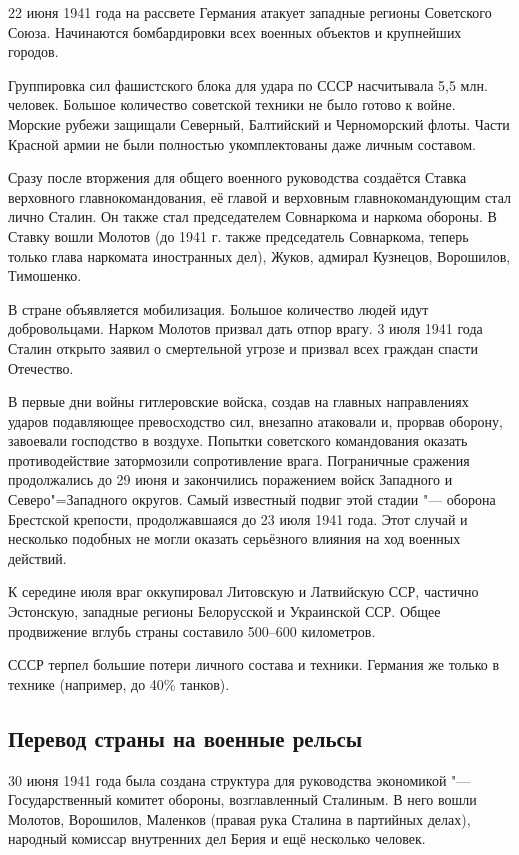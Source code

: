 22 июня 1941 года на рассвете Германия атакует западные регионы Советского Союза. Начинаются бомбардировки всех военных объектов и крупнейших городов.

Группировка сил фашистского блока для удара по СССР насчитывала 5,5 млн. человек. Большое количество советской техники не было готово к войне. Морские рубежи защищали Северный, Балтийский и Черноморский флоты. Части Красной армии не были полностью укомплектованы даже личным составом.

Сразу после вторжения для общего военного руководства создаётся Ставка верховного главнокомандования, её главой и верховным главнокомандующим стал лично Сталин. Он также стал председателем Совнаркома и наркома обороны. В Ставку вошли Молотов (до 1941 г. также председатель Совнаркома, теперь только глава наркомата иностранных дел), Жуков, адмирал Кузнецов, Ворошилов, Тимошенко.

В стране объявляется мобилизация. Большое количество людей идут добровольцами. Нарком Молотов призвал дать отпор врагу. 3 июля 1941 года Сталин открыто заявил о смертельной угрозе и призвал всех граждан спасти Отечество.

В первые дни войны гитлеровские войска, создав на главных направлениях ударов подавляющее превосходство сил, внезапно атаковали и, прорвав оборону, завоевали господство в воздухе. Попытки советского командования оказать противодействие затормозили сопротивление врага. Пограничные сражения продолжались до 29 июня и закончились поражением войск Западного и Северо"=Западного округов. Самый известный подвиг этой стадии "--- оборона Брестской крепости, продолжавшаяся до 23 июля 1941 года. Этот случай и несколько подобных не могли оказать серьёзного влияния на ход военных действий.

К середине июля враг оккупировал Литовскую и Латвийскую ССР, частично Эстонскую, западные регионы Белорусской и Украинской ССР. Общее продвижение вглубь страны составило 500--600 километров.

СССР терпел большие потери личного состава и техники. Германия же только в технике (например, до 40\% танков).


\subsection{Перевод страны на военные рельсы}
30 июня 1941 года была создана структура для руководства экономикой "--- Государственный комитет обороны, возглавленный Сталиным. В него вошли Молотов, Ворошилов, Маленков (правая рука Сталина в партийных делах), народный комиссар внутренних дел Берия и ещё несколько человек.

